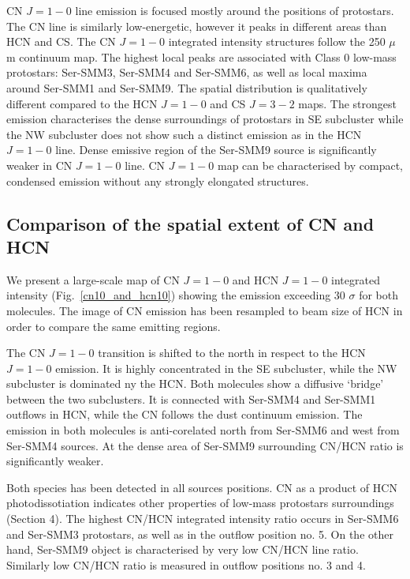 \documentclass{aa}
\begin{document}
CN $J=1-0$ line emission is focused mostly around the positions of protostars. The CN line is similarly low-energetic, however it peaks in different areas than HCN and CS. The CN $J=1-0$ integrated intensity structures follow the 250 $\mu$m continuum map. The highest local peaks are associated with Class 0 low-mass protostars: Ser-SMM3, Ser-SMM4 and Ser-SMM6, as well as local maxima around Ser-SMM1 and Ser-SMM9. The spatial distribution is qualitatively different compared to the HCN $J=1-0$ and CS $J=3-2$ maps. The strongest emission characterises the dense surroundings of protostars in SE subcluster while the NW subcluster does not show such a distinct emission as in the HCN $J=1-0$ line. Dense emissive region of the Ser-SMM9 source is significantly weaker in CN $J=1-0$ line. CN $J=1-0$ map can be characterised by compact, condensed emission without any strongly elongated structures. 


\subsection{Comparison of the spatial extent of CN and HCN}

We present a large-scale map of CN $J=1-0$ and HCN $J=1-0$ integrated intensity (Fig.~\ref{cn10_and_hcn10}) showing the emission exceeding 30 $\sigma$ for both molecules. The image of CN emission has been resampled to beam size of HCN in order to compare the same emitting regions. 

The CN $J=1-0$ transition is shifted to the north in respect to the HCN $J=1-0$ emission. It is highly concentrated in the SE subcluster, while the NW subcluster is dominated ny the HCN. Both molecules show a diffusive ‘bridge’ between the two subclusters. It is connected with Ser-SMM4 and Ser-SMM1 outflows in HCN, while the CN follows the dust continuum emission. The emission in both molecules is anti-corelated north from Ser-SMM6 and west from Ser-SMM4 sources. At the dense area of Ser-SMM9 surrounding CN/HCN ratio is significantly weaker. 

Both species has been detected in all sources positions. CN as a product of HCN photodissotiation indicates other properties of low-mass protostars surroundings (Section 4). The highest CN/HCN integrated intensity ratio occurs in Ser-SMM6 and Ser-SMM3 protostars, as well as in the outflow position no. 5. On the other hand, Ser-SMM9 object is characterised by very low CN/HCN line ratio. Similarly low CN/HCN ratio is measured in outflow positions no. 3 and 4. 
\end{document}
